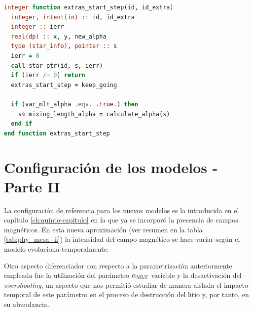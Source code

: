 \begin{lstlisting}[language=Fortran, float, caption={Rutina de MESA para ejecutar lógica adicional tras la ejecución de un paso de simulación.}, label={lst:extra_start_step}]
integer function extras_start_step(id, id_extra)
  integer, intent(in) :: id, id_extra
  integer :: ierr
  real(dp) :: x, y, new_alpha
  type (star_info), pointer :: s
  ierr = 0
  call star_ptr(id, s, ierr)
  if (ierr /= 0) return
  extras_start_step = keep_going
	
  if (var_mlt_alpha .eqv. .true.) then
    s% mixing_length_alpha = calculate_alpha(s)
  end if	
end function extras_start_step
\end{lstlisting}

\section{Configuración de los modelos - Parte II} \label{marco_teorico_ii}
La configuración de referencia para los nuevos modelos es la introducida en el capítulo \ref{ch:quinto-capitulo} en la que ya se incorporó la presencia de campos magnéticos. En esta nueva aproximación (ver resumen en la tabla \ref{tab:phy_mesa_ii}) la intensidad del campo magnético se hace variar según el modelo evoluciona temporalmente.\par 

Otro aspecto diferenciador con respecto a la parametrización anteriormente empleada fue la utilización del parámetro $\alpha_{\mathrm{MLT}}$ variable y la desactivación del \textit{overshooting}, un aspecto que nos permitió estudiar de manera aislada el impacto temporal de este parámetro en el proceso de destrucción del litio y, por tanto, en su abundancia.\par

